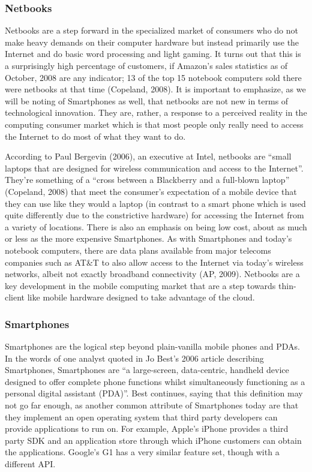 \documentclass[12pt,oneside,letterpaper]{article}
\begin{document}
\subsubsection{Netbooks}

Netbooks are a step forward in the specialized market of consumers who do not
make heavy demands on their computer hardware but instead primarily use the
Internet and do basic word processing and light gaming.  It turns out that this
is a surprisingly high percentage of customers, if Amazon's sales statistics as
of October, 2008 are any indicator; 13 of the top 15 notebook computers sold
there were netbooks at that time (Copeland, 2008).  It is important to
emphasize, as we will be noting of Smartphones as well, that netbooks are not
new in terms of technological innovation.  They are, rather, a response to a
perceived reality in the computing consumer market which is that most people
only really need to access the Internet to do most of what they want to do.

According to Paul Bergevin (2006), an executive at Intel, netbooks are ``small
laptops that are designed for wireless communication and access to the
Internet''.  They're something of a ``cross between a Blackberry and a
full-blown laptop'' (Copeland, 2008) that meet the consumer's expectation of a
mobile device that they can use like they would a laptop (in contrast to a smart
phone which is used quite differently due to the constrictive hardware) for
accessing the Internet from a variety of locations.  There is also an emphasis
on being low cost, about as much or less as the more expensive Smartphones.  As
with Smartphones and today's notebook computers, there are data plans available
from major telecoms companies such as AT\&T to also allow access to the Internet
via today's wireless networks, albeit not exactly broadband connectivity (AP,
2009).  Netbooks are a key development in the mobile computing market that are a
step towards thin-client like mobile hardware designed to take advantage of the
cloud.

\subsubsection{Smartphones}

Smartphones are the logical step beyond plain-vanilla mobile phones and PDAs.
In the words of one analyst quoted in Jo Best's 2006 article describing
Smartphones, Smartphones are ``a large-screen, data-centric, handheld device
designed to offer complete phone functions whilst simultaneously functioning as
a personal digital assistant (PDA)''.  Best continues, saying that this
definition may not go far enough, as another common attribute of Smartphones
today are that they implement an open operating system that third party
developers can provide applications to run on.  For example, Apple's iPhone
provides a third party SDK and an application store through which iPhone
customers can obtain the applications.  Google's G1 has a very similar feature
set, though with a different API.
\end{document}
